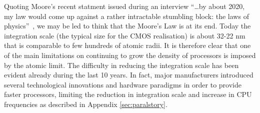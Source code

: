 Quoting Moore's recent statment  issued during an interview 
``\dots by about 2020, my law would come up against a rather 
intractable stumbling block: the laws of physics''~\cite{MooresFrase1},  
we may be led to think that the Moore's Law is at its end.
Today the integration scale (the typical size for the CMOS realisation) is 
about 32-22 nm that is comparable to few hundreds of atomic radii. It is 
therefore clear that one of the main limitations on continuing to grow 
the density of processors is imposed by the atomic limit. The 
difficulty in reducing 
the integration scale has been evident already during the last 10 
years. In fact, major manufacturers introduced several technological 
innovations and hardware paradigms in order to provide faster processors, 
limiting the reduction in integration scale and increase in CPU 
frequencies as described in Appendix \ref{sec:paralstory}.


